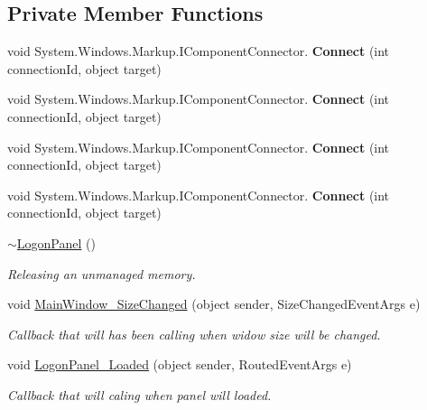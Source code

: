 \subsection*{Private Member Functions}
\begin{DoxyCompactItemize}
\item 
\mbox{\label{class_wpf_handler_1_1_u_i_1_1_controls_1_1_logon_1_1_logon_panel_aadd1d6dc671028b7a54d884bcb40e2c6}} 
void System.\+Windows.\+Markup.\+I\+Component\+Connector. {\bfseries Connect} (int connection\+Id, object target)
\item 
\mbox{\label{class_wpf_handler_1_1_u_i_1_1_controls_1_1_logon_1_1_logon_panel_aadd1d6dc671028b7a54d884bcb40e2c6}} 
void System.\+Windows.\+Markup.\+I\+Component\+Connector. {\bfseries Connect} (int connection\+Id, object target)
\item 
\mbox{\label{class_wpf_handler_1_1_u_i_1_1_controls_1_1_logon_1_1_logon_panel_aadd1d6dc671028b7a54d884bcb40e2c6}} 
void System.\+Windows.\+Markup.\+I\+Component\+Connector. {\bfseries Connect} (int connection\+Id, object target)
\item 
\mbox{\label{class_wpf_handler_1_1_u_i_1_1_controls_1_1_logon_1_1_logon_panel_aadd1d6dc671028b7a54d884bcb40e2c6}} 
void System.\+Windows.\+Markup.\+I\+Component\+Connector. {\bfseries Connect} (int connection\+Id, object target)
\item 
\mbox{\hyperlink{class_wpf_handler_1_1_u_i_1_1_controls_1_1_logon_1_1_logon_panel_a44c9cab77d3396169da4b97ec8edc9b5}{$\sim$\+Logon\+Panel}} ()
\begin{DoxyCompactList}\small\item\em Releasing an unmanaged memory. \end{DoxyCompactList}\item 
void \mbox{\hyperlink{class_wpf_handler_1_1_u_i_1_1_controls_1_1_logon_1_1_logon_panel_a4f72805700420f21360f6d5ffa5c57e0}{Main\+Window\+\_\+\+Size\+Changed}} (object sender, Size\+Changed\+Event\+Args e)
\begin{DoxyCompactList}\small\item\em Callback that will has been calling when widow size will be changed. \end{DoxyCompactList}\item 
void \mbox{\hyperlink{class_wpf_handler_1_1_u_i_1_1_controls_1_1_logon_1_1_logon_panel_a15ae3f2fcfd57772403ee512f9b9b649}{Logon\+Panel\+\_\+\+Loaded}} (object sender, Routed\+Event\+Args e)
\begin{DoxyCompactList}\small\item\em Callback that will caling when panel will loaded. \end{DoxyCompactList}\end{DoxyCompactItemize}
